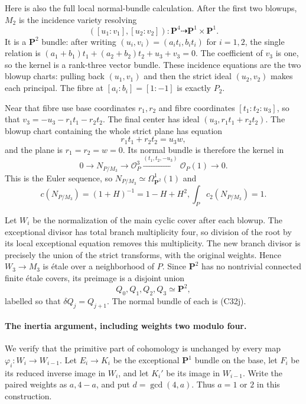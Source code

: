 \documentclass[11pt]{article}
\theoremstyle{definition}\newtheorem{definition}[theorem]{Definition}\newtheorem{remark}[theorem]{Remark}
\begin{document}
Here is also the full local normal-bundle
calculation.  After the first two blowups,
$M_2$ is the incidence variety resolving
\[
        ([u_1:v_1],[u_2:v_2]):\mathbf P^4
                                         \dashrightarrow\mathbf P^1\times\mathbf P^1.
\]
It is a $\mathbf P^2$ bundle: after writing
$(u_i,v_i)=(a_i t_i,b_i t_i)$ for $i=1,2$,
the single relation is
$(a_1+b_1)t_1+(a_2+b_2)t_2+u_3+v_3=0$.
The coefficient of $v_3$ is one, so the kernel
is a rank-three vector bundle.  These incidence
equations are the two blowup charts: pulling
back $(u_1,v_1)$ and then the strict ideal
$(u_2,v_2)$ makes each principal.  The fibre at
$[a_i:b_i]=[1:-1]$ is exactly $P_2$.

Near that fibre use base coordinates $r_1,r_2$
and fibre coordinates $[t_1:t_2:u_3]$, so that
$v_3=-u_3-r_1t_1-r_2t_2$.  The final center has
ideal $(u_3,r_1t_1+r_2t_2)$.  The blowup chart
containing the whole strict plane has equation
\[
                    r_1t_1+r_2t_2=u_3w,
\]
and the plane is $r_1=r_2=w=0$.  Its normal
bundle is therefore the kernel in
\[
 0\longrightarrow N_{P/M_3}\longrightarrow
 \mathcal O_P^3
 \xrightarrow{(t_1,t_2,-u_3)}\mathcal O_P(1)
 \longrightarrow0.
                                                        \tag{C32j}
\]
This is the Euler sequence, so
$N_{P/M_3}\simeq\Omega^1_{\mathbf P^2}(1)$ and
\[
 c(N_{P/M_3})=(1+H)^{-1}=1-H+H^2,
                    \int_P c_2(N_{P/M_3})=1.
                                                        \tag{C32k}
\]

Let $W_i$ be the normalization of the main cyclic
cover after each blowup.  The exceptional divisor
has total branch multiplicity four, so division
of the root by its local exceptional equation
removes this multiplicity.  The new branch
divisor is precisely the union of the strict
transforms, with the original weights.  Hence
$W_3\to M_3$ is \'etale over a neighborhood of
$P$.  Since $\mathbf P^2$ has no nontrivial
connected finite \'etale covers, its preimage
is a disjoint union
\[
                      Q_0,Q_1,Q_2,Q_3\simeq\mathbf P^2,
\]
labelled so that $\delta Q_j=Q_{j+1}$.
The normal bundle of each is (C32j).

\paragraph{The inertia argument, including weights two modulo four.}
We verify that the primitive part of cohomology is
unchanged by every map $\varphi_i:W_i\to W_{i-1}$.
Let $E_i\to K_i$ be the exceptional $\mathbf P^1$
bundle on the base, let $F_i$ be its reduced
inverse image in $W_i$, and let $K_i'$ be its
image in $W_{i-1}$.  Write the paired weights
as $a,4-a$, and put $d=\gcd(4,a)$.  Thus
$a=1$ or $2$ in this construction.
\end{document}
